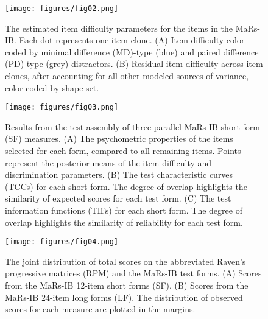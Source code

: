 \documentclass[a4paper,man,natbib,noextraspace]{apa6}
\begin{document}
\begin{figure}
\centering
\texttt{[image: figures/fig02.png]}
\caption{\label{fig:fig02} The estimated item difficulty parameters for the items in the MaRs-IB. Each dot represents one item clone. (A) Item difficulty color-coded by minimal difference (MD)-type (blue) and paired difference (PD)-type (grey) distractors. (B) Residual item difficulty across item clones, after accounting for all other modeled sources of variance, color-coded by shape set.}
\end{figure}
 
\begin{figure}
\centering
\texttt{[image: figures/fig03.png]}
\caption{\label{fig:fig03}Results from the test assembly of three parallel MaRs-IB short form (SF) measures. (A) The psychometric properties of the items selected for each form, compared to all remaining items. Points represent the posterior means of the item difficulty and discrimination  parameters. (B) The test characteristic curves (TCCs) for each short form. The degree of overlap highlights the similarity of expected scores for each test form. (C) The test information functions (TIFs) for each short form. The degree of overlap highlights the similarity of reliability for each test form.}
\end{figure}

\begin{figure}
\centering
\texttt{[image: figures/fig04.png]}
\caption{\label{fig:fig04}The joint distribution of total scores on the abbreviated Raven's progressive matrices (RPM) and the MaRs-IB test forms. (A) Scores from the MaRs-IB 12-item short forms (SF). (B) Scores from the MaRs-IB 24-item long forms (LF). The distribution of observed scores for each measure are plotted in the margins.}
\end{figure}
\end{document}
